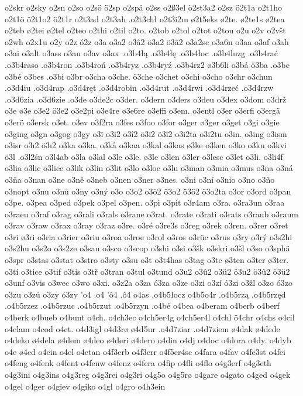 {{o2skr
o2sky
o2sn
o2so
o2sö
ö2sp
o2spä
o2ss
o2ß3el
ö2st3a2
o2sz
ö2t1a
o2t1ho
o2t1ö
ö2t1o2
ö2t1r
o2t3ad
o2t3ah
.o2t3chł
o2t3i2m
ø2t5eks
ø2te.
ø2te1s
ø2tea
o2teb
ø2tei
ø2tel
o2teo
o2thi
o2til
o2to.
o2tob
o2tol
o2tot
o2tou
o2u
o2v
o2všt
o2wh
o2x1u
o2y
o2z
ó2z
o3a
o3a2
o3â2
ö3a2
ö3â2
o3a2sc
o3a6n
o3aa
o3af
o3ah
o3ai
o3alt
o3ass
o3au
o3av
o3ax
.o3b4łą
.o3b4łę
.o3b4łoc
.o3b4luzg
.o3b4rać
.o3b4raso
.o3b4ron
.o3b4roń
.o3b4ryz
.o3b4ryź
.o3b4rz2
ø3b6li
o3bå
ö3ba
.o3be
o3bé
o3bes
.o3bi
o3br
o3cha
o3che.
ö3che
o3chet
o3chi
o3cho
o3chr
o3chun
.o3d4iu
.o3d4rap
.o3d4ręt
.o3d4robin
.o3d4rut
.o3d4rwi
.o3d4rzeć
.o3d4rzw
.o3d6zia
.o3d6zie
.o3de
o3de2c
o3der.
o3dern
o3ders
o3deu
o3dex
o3dom
o3drž
o3e
ø3e
o3e2
ö3e2
o3e2pi
o3e4re
ø3e6re
o3effi
o3em.
o3entl
o3er
o3erfi
o3ergä
o3erö
o3ersk
o3et.
o3ev
o3f2ra
o3fes
o3foo
o3for
o3ger
ø3ger
o3get
o3gi
o3gie
o3ging
o3gn
o3gog
o3gy
o3ï
o3i2
o3î2
ö3i2
ö3î2
o3i2ta
o3i2tu
o3in.
o3ing
o3ism
o3isr
o3ı2
ö3ı2
o3ka
o3ka.
o3kå
o3kaa
o3kal
o3kas
ø3ke
o3ken
o3ko
o3ku
o3kvi
ö3l
.o3l2śn
o3l4ab
o3la
o3lal
o3le
o3le.
ø3le
o3len
ö3ler
o3lesc
o3let
o3li.
o3li4f
o3lia
o3lic
o3lice
o3lik
o3lin
o3lit
o3lo
o3loe
o3lu
o3man
o3mia
o3mus
o3na
o3ná
o3ňa
o3nan
o3ne
o3ně
o3neb
o3nen
o3ner
ø3nes.
o3ni
o3ní
o3nio
o3no
o3ňo
o3nopt
o3nu
o3nů
o3ny
o3ný
o3o
o3o2
o3ö2
ö3o2
ö3ö2
ö3o2ta
o3or
o3ord
o3pan
o3pe.
o3pea
o3ped
o3pek
o3pel
o3pen.
o3pi
o3pit
o3r4am
o3ra.
o3ra3un
o3raa
o3raeu
o3raf
o3rag
o3rali
o3rals
o3rane
o3rat.
o3rate
o3rati
o3rats
o3raub
o3raum
o3rav
o3raw
o3rax
o3ray
o3raz
o3re.
o3ré
o3re3s
o3reg
o3rek
o3ren.
o3rer
o3ret
o3ri
ø3ri
o3ria
o3rier
o3riu
o3roa
o3roe
o3rol
o3ros
o3rüc
o3rus
o3ry
o3rý
o3s2hi
o3s2hu
o3s2o
o3s2ze
o3sau
o3sco
o3scop
o3shi
o3si
o3šk
o3skri
o3šl
o3so
o3sphä
o3spr
o3stas
o3stat
o3stro
o3sty
o3su
o3t
o3t4has
o3tag
o3te
ø3ten
o3ter
ø3ter.
o3tí
o3tice
o3tif
o3tis
o3tř
o3tran
o3tul
o3tund
o3u2
o3û2
o3ü2
ö3u2
ö3û2
ö3ü2
o3unf
o3vis
o3wec
o3wo
o3xi.
o3z2a
o3za
ó3za
o3ze
o3zi
o3zí
ó3zi
o3žl
o3zo
ó3zo
o3zu
o3zů
o3zy
ó3zy
'o4
.o4
'ô4
.ô4
o4as
.o4b5łocz
o4b5o4r
.o4b5rzą
.o4b5rzęd
.o4b5rzez
.o4b5rzuc
.o4b5rzut
.o4b5rzyn
.o4bé
o4bea
o4beram
o4berb
o4berf
o4berk
o4bueb
o4bunt
o4ch.
o4ch3ec
o4ch5er4g
o4ch5er4l
o4chl
ö4chr
o4chs
o4cil
o4clam
o4cod
o4ct.
o4d3igl
o4d3rø
ø4d5ur
.o4d7ziar
.o4d7ziem
ø4dak
ø4dede
o4deko
ø4dela
ø4dem
ø4deo
ø4deri
ø4dero
o4din
o4dj
o4doc
o4dora
o4dy.
o4dyb
o4e
ø4ed
o4ein
o4el
o4etan
o4f3erb
o4f3err
o4f5er4sc
o4fara
o4fav
o4fe3st
o4fei
o4feng
o4fenk
o4fent
o4fenw
o4fenz
o4fera
o4fip
o4fli
o4flo
o4g3erf
o4g3eth
o4g3ini
o4g3ins
o4g3reg
o4g3rei
o4g3ri
o4g5o
o4g5rø
o4gare
o4gato
o4ged
o4gek
o4gel
o4ger
o4giev
o4giko
o4gl
o4gro
o4h3ein
}}
